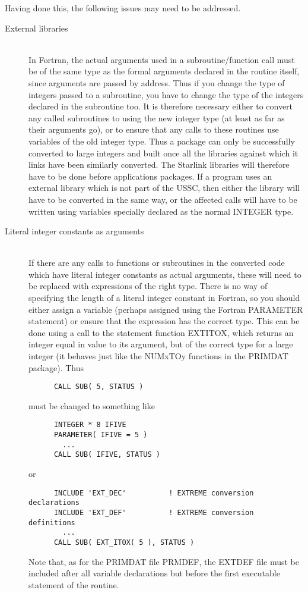 \documentclass[twoside,11pt]{article}
\newcommand{\xref}[3]{#1}
\renewcommand{\_}{\texttt{\symbol{95}}}
\begin{document}
Having done this, the following issues may need to be addressed.
\begin{description}
%
\item[External libraries]\mbox{}
\\
In Fortran, the actual arguments used in a subroutine/function
call must be of the same type as the formal arguments declared
in the routine itself, since arguments are passed by address.
Thus if you change the type of integers passed to a subroutine,
you have to change the type of the integers declared in the subroutine too.
It is therefore necessary either to convert any called subroutines
to using the new integer type (at least as far as their arguments go), 
or to ensure that any calls to these routines use variables of 
the old integer type.
Thus a package can only be successfully converted to large integers
and built once all the libraries against which it links have been 
similarly converted.  The Starlink libraries will therefore have to
be done before applications packages.
If a program uses an external library which is not part of the USSC,
then either the library will have to be converted in the same way,
or the affected calls will have to be written using 
variables specially declared as the normal INTEGER type.
%
\item[Literal integer constants as arguments]\mbox{}
\\
If there are any calls to functions or subroutines in the converted 
code which have literal integer constants as actual arguments,
these will need to be replaced with expressions of the right type.
There is no way of specifying the length of a literal integer constant
in Fortran, so you should either assign a variable (perhaps assigned
using the Fortran PARAMETER statement) or ensure that the expression
has the correct type.  This can be done using a call to the statement
function EXT\_ITOX, which returns an integer equal in value to its
argument, but of the correct type for a large integer
(it behaves just like the NUM\_xTOy functions in the 
\xref{PRIMDAT}{sun39}{} package).
Thus
\begin{squote}
\begin{verbatim}
      CALL SUB( 5, STATUS )
\end{verbatim}
\end{squote}
must be changed to something like
\begin{squote}
\begin{verbatim}
      INTEGER * 8 IFIVE
      PARAMETER( IFIVE = 5 )
        ...
      CALL SUB( IFIVE, STATUS )
\end{verbatim}
\end{squote}
or
\begin{squote}
\begin{verbatim}
      INCLUDE 'EXT_DEC'          ! EXTREME conversion declarations
      INCLUDE 'EXT_DEF'          ! EXTREME conversion definitions
        ...
      CALL SUB( EXT_ITOX( 5 ), STATUS )
\end{verbatim}
\end{squote}
Note that, as for the PRIMDAT file PRM\_DEF, the EXT\_DEF 
file must be included after all variable declarations but before
the first executable statement of the routine.


\end{description}
\end{document}
